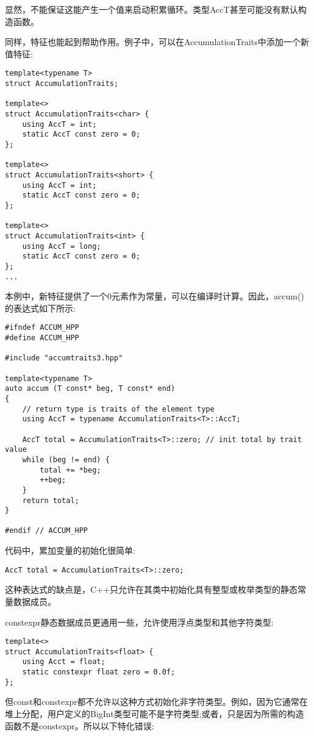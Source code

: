 显然，不能保证这能产生一个值来启动积累循环。类型AccT甚至可能没有默认构造函数。

同样，特征也能起到帮助作用。例子中，可以在AccumulationTraits中添加一个新值特征:

\begin{lstlisting}[style=styleCXX]
template<typename T>
struct AccumulationTraits;

template<>
struct AccumulationTraits<char> {
	using AccT = int;
	static AccT const zero = 0;
};

template<>
struct AccumulationTraits<short> {
	using AccT = int;
	static AccT const zero = 0;
};

template<>
struct AccumulationTraits<int> {
	using AccT = long;
	static AccT const zero = 0;
};
...
\end{lstlisting}

本例中，新特征提供了一个0元素作为常量，可以在编译时计算。因此，accum()的表达式如下所示:

\begin{lstlisting}[style=styleCXX]
#ifndef ACCUM_HPP
#define ACCUM_HPP

#include "accumtraits3.hpp"

template<typename T>
auto accum (T const* beg, T const* end)
{
	// return type is traits of the element type
	using AccT = typename AccumulationTraits<T>::AccT;
	
	AccT total = AccumulationTraits<T>::zero; // init total by trait value
	while (beg != end) {
		total += *beg;
		++beg;
	}
	return total;
}

#endif // ACCUM_HPP
\end{lstlisting}

代码中，累加变量的初始化很简单:

\begin{lstlisting}[style=styleCXX]
AccT total = AccumulationTraits<T>::zero;
\end{lstlisting}

这种表达式的缺点是，C++只允许在其类中初始化具有整型或枚举类型的静态常量数据成员。

constexpr静态数据成员更通用一些，允许使用浮点类型和其他字符类型:

\begin{lstlisting}[style=styleCXX]
template<>
struct AccumulationTraits<float> {
	using Acct = float;
	static constexpr float zero = 0.0f;
};
\end{lstlisting}

但const和constexpr都不允许以这种方式初始化非字符类型。例如，因为它通常在堆上分配，用户定义的BigInt类型可能不是字符类型;或者，只是因为所需的构造函数不是constexpr。所以以下特化错误:

